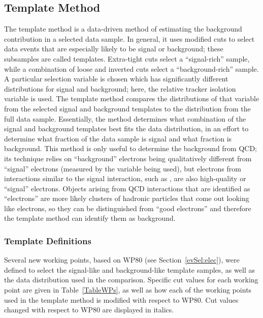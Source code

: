 \subsection{Template Method}
\label{anMeth:BGSubTemplate}
The template method is a 
data-driven 
method 
of estimating the background contribution 
in a selected data sample.  
In general, it uses modified cuts 
to select data events that are especially 
likely to be signal or background; 
these subsamples are called templates.  
Extra-tight cuts select a ``signal-rich'' sample, 
while a combination of loose and inverted cuts 
select a ``background-rich'' sample.  
A particular selection variable is chosen 
which has significantly different distributions 
for signal and background; 
here, the relative tracker isolation variable is used.  
The template method compares the 
distributions of that variable 
from the selected signal and background templates 
to the distribution from the full data sample. %
Essentially, the method determines what 
combination of the signal and background templates 
best fits the data distribution, 
in an effort to determine what fraction 
of the data sample is signal 
and what fraction is background.  
This method is only useful to determine the 
background from QCD; 
its technique relies on ``background'' electrons 
being qualitatively different from 
``signal'' electrons %
(measured by the variable being used), 
but electrons from interactions similar 
to the signal interaction, 
such as \Wenu, 
are also high-quality or ``signal'' electrons. %
Objects arising from QCD interactions that are 
identified as ``electrons'' are more likely 
clusters of hadronic particles 
that come out looking like electrons, 
so they can be distinguished from 
``good electrons'' and therefore 
the template method can identify 
them as background.  

\subsubsection{Template Definitions}
\label{anMeth:BGSubTemplateDefs}

Several new working points, based on WP80 
(see Section~\ref{evSel:elec}), 
were defined to select 
the signal-like and background-like template samples, 
as well as the data distribution used in the comparison.  
Specific cut values for each working point 
are given in 
Table~\ref{TableWPs}, %
as well as 
how each of the working points used 
in the template method is modified with 
respect to WP80.  
Cut values changed with respect to WP80 
are displayed in italics.  

